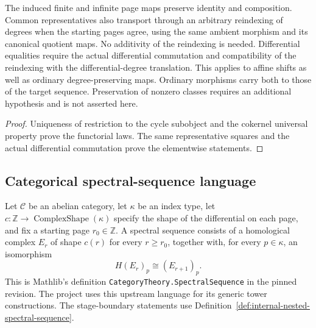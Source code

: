 \begin{proposition}
  \label{prop:internal-page-naturality}
  \leanok
  The induced finite and infinite page maps preserve identity and composition.
  Common representatives also transport through an arbitrary reindexing of
  degrees when the starting pages agree, using the same ambient morphism
  and its canonical quotient maps. No additivity of the reindexing is needed.
  Differential equalities require the actual differential commutation and
  compatibility of the reindexing with the differential-degree translation.
  This applies to affine shifts as well as ordinary degree-preserving maps.
  Ordinary morphisms carry both to those of the target sequence. Preservation of nonzero classes requires an additional
  hypothesis and is not asserted here.
\end{proposition}
\begin{proof}
  Uniqueness of restriction to the cycle subobject and the cokernel universal
  property prove the functorial laws. The same representative squares and the
  actual differential commutation prove the elementwise statements.
  \leanok
\end{proof}

\subsection{Categorical spectral-sequence language}

\begin{definition}
  \label{def:mathlib-spectral-sequence}
  \mathlibok
  Let $\mathcal C$ be an abelian category, let $\kappa$ be an index type, let
  $c : \mathbb Z \to \operatorname{ComplexShape}(\kappa)$ specify the shape
  of the differential on each page, and fix a starting page $r_0\in\mathbb Z$.
  A spectral sequence consists of a homological complex $E_r$ of shape $c(r)$
  for every $r\ge r_0$, together with, for every $p\in\kappa$, an isomorphism
  \[
    H(E_r)_p \cong (E_{r+1})_p.
  \]
  This is Mathlib's definition \texttt{CategoryTheory.SpectralSequence} in
  the pinned revision.  The project uses this upstream language for its generic tower
  constructions. The stage-boundary statements use
  Definition~\ref{def:internal-nested-spectral-sequence}.
\end{definition}

